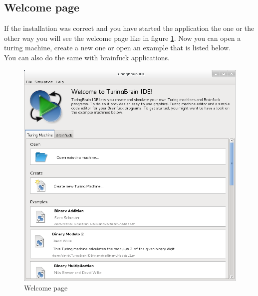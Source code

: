 \documentclass[%
  a4paper,%
  11pt,%
  blue,%
  hyperref	%
  ]{tubsartcl}
\begin{document}
\subsection{Welcome page}
\label{sec:welcome-page}
If the installation was correct and you have started the application the one or the other way you will see the welcome page like in figure \ref{pic:welcome_page}. Now you can open a turing machine, create a new one or open an example that is listed below. \\
You can also do the same with brainfuck applications.
\begin{figure}[!htb]
\begin{center}
\includegraphics[scale=0.45]{graphics_gui/welcomescreen.png}
\end{center}
\caption{Welcome page}
\label{pic:welcome_page}
\end{figure}

\newpage
\end{document}
